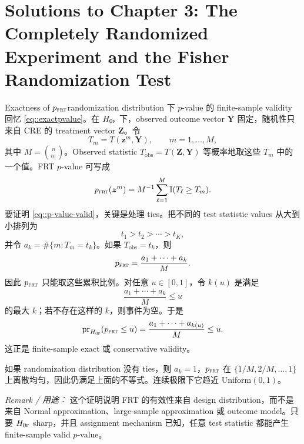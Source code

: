 \chapter{Solutions to Chapter 3: The Completely Randomized Experiment and the Fisher Randomization Test}
\label{sol:chapter03}

\begin{exercisesolution}{Exactness of $p_{\textsc{frt}}$}{randomization distribution 下 $p$-value 的 finite-sample validity}
回忆 \cref{eq::exactpvalue}。在 $H_{0\textsc{f}}$ 下，observed outcome vector $\boldsymbol{Y}$ 固定，随机性只来自 CRE 的 treatment vector $\boldsymbol{Z}$。令
\[
T_m=T(\boldsymbol{z}^m,\boldsymbol{Y}),\qquad m=1,\ldots,M,
\]
其中 $M=\binom{n}{n_1}$。Observed statistic $T_{\mathrm{obs}}=T(\boldsymbol{Z},\boldsymbol{Y})$ 等概率地取这些 $T_m$ 中的一个值。FRT $p$-value 可写成
\[
p_{\textsc{frt}}(\boldsymbol{z}^m)
=M^{-1}\sum_{\ell=1}^M \mathbb{I}(T_\ell\geq T_m).
\]
要证明 \cref{eq::p-value-valid}，关键是处理 ties。把不同的 test statistic values 从大到小排列为
\[
t_1>t_2>\cdots>t_K,
\]
并令 $a_k=\#\{m:T_m=t_k\}$。如果 $T_{\mathrm{obs}}=t_k$，则
\[
p_{\textsc{frt}}=\frac{a_1+\cdots+a_k}{M}.
\]
因此 $p_{\textsc{frt}}$ 只能取这些累积比例。对任意 $u\in[0,1]$，令 $k(u)$ 是满足
\[
\frac{a_1+\cdots+a_k}{M}\leq u
\]
的最大 $k$；若不存在这样的 $k$，则事件为空。于是
\[
\textup{pr}_{H_{0\textsc{f}}}(p_{\textsc{frt}}\leq u)
=\frac{a_1+\cdots+a_{k(u)}}{M}
\leq u.
\]
这正是 finite-sample exact 或 conservative validity。

如果 randomization distribution 没有 ties，则 $a_k=1$，$p_{\textsc{frt}}$ 在 $\{1/M,2/M,\ldots,1\}$ 上离散均匀，因此仍满足上面的不等式。连续极限下它趋近 Uniform$(0,1)$。

\emph{Remark / 用途：} 这个证明说明 FRT 的有效性来自 design distribution，而不是来自 Normal approximation、large-sample approximation 或 outcome model。只要 $H_{0\textsc{f}}$ sharp，并且 assignment mechanism 已知，任意 test statistic 都能产生 finite-sample valid $p$-value。
\end{exercisesolution}

